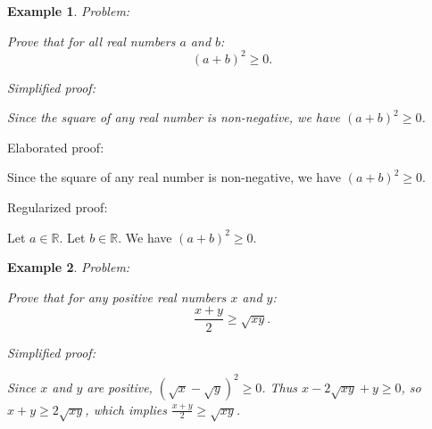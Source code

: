 \documentclass{article}
\newtheorem{example}{Example}
\begin{document}



\begin{example}
Problem:
\begin{tcolorbox}[colback=yellow!10, width=\linewidth]
Prove that for all real numbers $a$ and $b$:
    $$(a+b)^2 \geq 0.$$
\end{tcolorbox}

Simplified proof:
\begin{tcolorbox}[colback=blue!10, width=\linewidth]
Since the square of any real number is non-negative, we have $(a+b)^2 \ge 0$.
\end{tcolorbox}
\end{example}

Elaborated proof:
\begin{tcolorbox}[colback=green!10, width=\linewidth]
Since the square of any real number is non-negative, we have $(a+b)^2 \ge 0$.
\end{tcolorbox}

Regularized proof:
\begin{tcolorbox}[colback=red!10, width=\linewidth]
Let $a\in\mathbb{R}$.
Let $b\in\mathbb{R}$.
We have $(a+b)^2 \ge 0$.
\end{tcolorbox}



\begin{example}
Problem:
\begin{tcolorbox}[colback=yellow!10, width=\linewidth]
Prove that for any positive real numbers $x$ and $y$:
    $$\frac{x+y}{2} \geq \sqrt{xy}.$$
\end{tcolorbox}

Simplified proof:
\begin{tcolorbox}[colback=blue!10, width=\linewidth]
Since $x$ and $y$ are positive, $(\sqrt{x} - \sqrt{y})^2 \ge 0$. Thus $x - 2\sqrt{xy} + y \ge 0$, so $x+y \ge 2\sqrt{xy}$, which implies $\frac{x+y}{2} \ge \sqrt{xy}$.
\end{tcolorbox}
\end{example}
\end{document}
